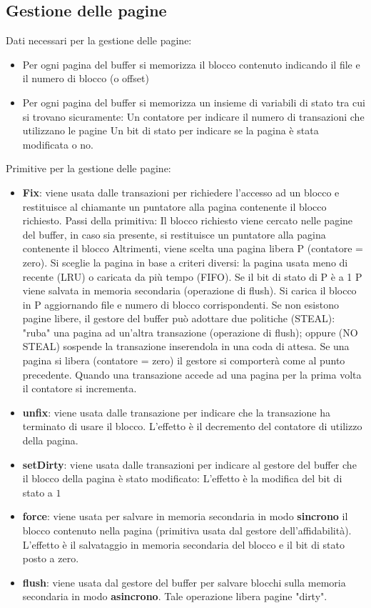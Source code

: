 \documentclass[a4paper, 10pt]{article}
\theoremstyle{definition}
\begin{document}
		\subsection{Gestione delle pagine}
		Dati necessari per la gestione delle pagine:
		\begin{itemize}
			\item Per ogni pagina del buffer si memorizza il blocco contenuto
			indicando il file e il numero di blocco (o offset)
			\item Per ogni pagina del buffer si memorizza un insieme di variabili
			di stato tra cui si trovano sicuramente:
				\subitem{-} Un
				contatore per indicare il numero di transazioni che utilizzano le
				pagine
				\subitem{-} Un bit di stato per indicare se la pagina è stata modificata o no.
		\end{itemize}
		Primitive per la gestione delle pagine:
		\begin{itemize}
			\item \textbf{Fix}: viene usata dalle transazioni per richiedere l'accesso ad un
			blocco e restituisce al chiamante un puntatore alla pagina contenente
			il blocco richiesto. Passi della primitiva:
				\subitem{-} Il blocco richiesto viene cercato nelle pagine del buffer, in caso sia
				presente, si restituisce un puntatore alla pagina contenente il blocco
				\subitem{-} Altrimenti, viene scelta una pagina libera P (contatore = zero). Si sceglie la
				pagina in base a criteri diversi: la pagina usata meno di recente (LRU) o
				caricata da più tempo (FIFO). Se il bit di stato di P è a 1 P viene salvata in
				memoria secondaria (operazione di flush). Si carica il blocco in P
				aggiornando file e numero di blocco corrispondenti.
				\subitem{-} Se non esistono pagine libere, il gestore del buffer può adottare due
				politiche (STEAL): "ruba" una pagina ad un'altra transazione (operazione
				di flush); oppure (NO STEAL) sospende la transazione inserendola in una
				coda di attesa. Se una pagina si libera (contatore = zero) il gestore si
				comporterà come al punto precedente.
				\subitem{-} Quando una transazione accede ad una pagina per la prima volta il
				contatore si incrementa.
			\item \textbf{unfix}: viene usata dalle transazione per indicare che la transazione ha
			terminato di usare il blocco. L’effetto è il decremento del contatore di utilizzo della pagina.
			\item \textbf{setDirty}: viene usata dalle transazioni per indicare al gestore del
			buffer che il blocco della pagina è stato modificato: L'effetto è la modifica del bit di stato a $1$
			\item \textbf{force}: viene usata per salvare in memoria secondaria in modo
			\textbf{sincrono} il blocco contenuto nella pagina (primitiva usata dal
			gestore dell'affidabilità). L'effetto è il salvataggio in memoria secondaria del blocco e il bit di stato posto a zero.
			\item \textbf{flush}: viene usata dal gestore del buffer per salvare blocchi sulla
			memoria secondaria in modo \textbf{asincrono}. Tale operazione libera
			pagine "dirty".
		\end{itemize}
		
\end{document}
